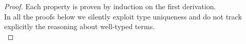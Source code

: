 \documentclass{article}
\newcommand{\csn}{\mathsf{sn}}
\newcommand{\red}{\longrightarrow}
\begin{document}
\begin{proof}
Each property is proven by induction on the first derivation. 
\\[1em]
In all the proofs below we silently exploit type uniqueness and do not track explicitly the reasoning about well-typed terms.
\\[1em]
%

\end{proof}
\end{document}
